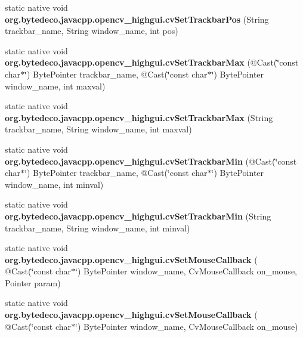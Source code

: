 \begin{DoxyCompactItemize}
\mbox{\label{group__highgui__c_ga29db0b732095ac2667f4e1a036a84439}} 
static native void {\bfseries org.\+bytedeco.\+javacpp.\+opencv\+\_\+highgui.\+cv\+Set\+Trackbar\+Pos} (String trackbar\+\_\+name, String window\+\_\+name, int pos)
\item 
\mbox{\label{group__highgui__c_ga6ca706c75a0964645ceb24661ee46d7e}} 
static native void {\bfseries org.\+bytedeco.\+javacpp.\+opencv\+\_\+highgui.\+cv\+Set\+Trackbar\+Max} (@Cast(\char`\"{}const char$\ast$\char`\"{}) Byte\+Pointer trackbar\+\_\+name, @Cast(\char`\"{}const char$\ast$\char`\"{}) Byte\+Pointer window\+\_\+name, int maxval)
\item 
\mbox{\label{group__highgui__c_ga70f7fcaf5158618e3b378da2f6a0da09}} 
static native void {\bfseries org.\+bytedeco.\+javacpp.\+opencv\+\_\+highgui.\+cv\+Set\+Trackbar\+Max} (String trackbar\+\_\+name, String window\+\_\+name, int maxval)
\item 
\mbox{\label{group__highgui__c_ga734d887b82205d96a28656db12374ccb}} 
static native void {\bfseries org.\+bytedeco.\+javacpp.\+opencv\+\_\+highgui.\+cv\+Set\+Trackbar\+Min} (@Cast(\char`\"{}const char$\ast$\char`\"{}) Byte\+Pointer trackbar\+\_\+name, @Cast(\char`\"{}const char$\ast$\char`\"{}) Byte\+Pointer window\+\_\+name, int minval)
\item 
\mbox{\label{group__highgui__c_ga23fc5c6d09f39814898485ded4885b2e}} 
static native void {\bfseries org.\+bytedeco.\+javacpp.\+opencv\+\_\+highgui.\+cv\+Set\+Trackbar\+Min} (String trackbar\+\_\+name, String window\+\_\+name, int minval)
\item 
\mbox{\label{group__highgui__c_ga4debcbdac00a4fe181afcd274001059d}} 
static native void {\bfseries org.\+bytedeco.\+javacpp.\+opencv\+\_\+highgui.\+cv\+Set\+Mouse\+Callback} ( @Cast(\char`\"{}const char$\ast$\char`\"{}) Byte\+Pointer window\+\_\+name, Cv\+Mouse\+Callback on\+\_\+mouse, Pointer param)
\item 
\mbox{\label{group__highgui__c_ga97de5af3a41d867f73630d10e927fa07}} 
static native void {\bfseries org.\+bytedeco.\+javacpp.\+opencv\+\_\+highgui.\+cv\+Set\+Mouse\+Callback} ( @Cast(\char`\"{}const char$\ast$\char`\"{}) Byte\+Pointer window\+\_\+name, Cv\+Mouse\+Callback on\+\_\+mouse)

\end{DoxyCompactItemize}
